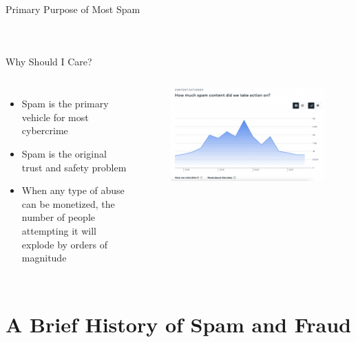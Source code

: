 \documentclass[nobackground,dvipsnames,table]{beamer}
\begin{document}
\begin{frame}{Primary Purpose of Most Spam}
\begin{columns}
\begin{figure}
            \end{figure}
    \end{columns}
\end{frame}

\begin{frame}{Why Should I Care?}
    \begin{columns}
            \begin{itemize}
                \item Spam is the primary vehicle for most cybercrime
                \item Spam is the original trust and safety problem
                \item When any type of abuse can be monetized, the number of people attempting it will explode by orders of magnitude
            \end{itemize}
            \begin{figure}
                \centering
                \includegraphics[width=\textwidth]{spam-content-removed}
            \end{figure}
    \end{columns}
\end{frame}

\section{A Brief History of Spam and Fraud}
\end{document}
